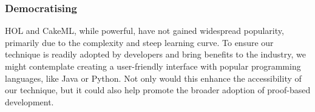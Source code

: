 \subsubsection{Democratising}
HOL and CakeML, while powerful, have not gained widespread popularity, primarily due to the complexity and steep learning curve. To ensure our technique is readily adopted by developers and bring benefits to the industry, we might contemplate creating a user-friendly interface with popular programming languages, like Java or Python. Not only would this enhance the accessibility of our technique, but it could also help promote the broader adoption of proof-based development.